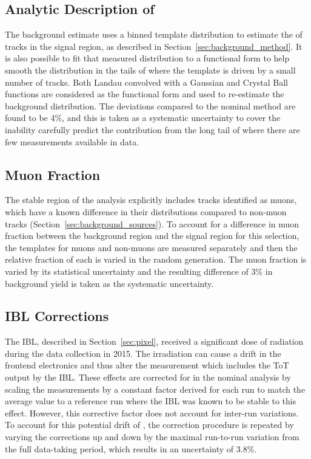 \subsection{Analytic Description of \dedx}

The background estimate uses a binned template distribution to estimate the \dedx of tracks in the signal region, as described in Section~\ref{sec:background_method}.
It is also possible to fit that measured distribution to a functional form to help smooth the distribution in the tails of \dedx where the template is driven by a small number of tracks.
Both Landau convolved with a Gaussian and Crystal Ball functions are considered as the functional form and used to re-estimate the background distribution.
The deviations compared to the nominal method are found to be 4\%, and this is taken as a systematic uncertainty to cover the inability carefully predict the contribution from the long tail of \dedx where there are few measurements available in data.

\subsection{Muon Fraction}

The stable region of the analysis explicitly includes tracks identified as muons, which have a known difference in their \dedx distributions compared to non-muon tracks (Section~\ref{sec:background_sources}).
To account for a difference in muon fraction between the background region and the signal region for this selection, the \dedx templates for muons and non-muons are measured separately and then the relative fraction of each is varied in the random generation.
The muon fraction is varied by its statistical uncertainty and the resulting difference of 3\% in background yield is taken as the systematic uncertainty.

\subsection{\acs{IBL} Corrections}

The \ac{IBL}, described in Section~\ref{sec:pixel}, received a significant dose of radiation during the data collection in 2015.
The irradiation can cause a drift in the frontend electronics and thus alter the \dedx measurement which includes the \ac{ToT} output by the \ac{IBL}.
These effects are corrected for in the nominal analysis by scaling the \dedx measurements by a constant factor derived for each run to match the average \dedx value to a reference run where the \ac{IBL} was known to be stable to this effect.
However, this corrective factor does not account for inter-run variations.
To account for this potential drift of \dedx, the correction procedure is repeated by varying the corrections up and down by the maximal run-to-run variation from the full data-taking period, which results in an uncertainty of 3.8\%.

